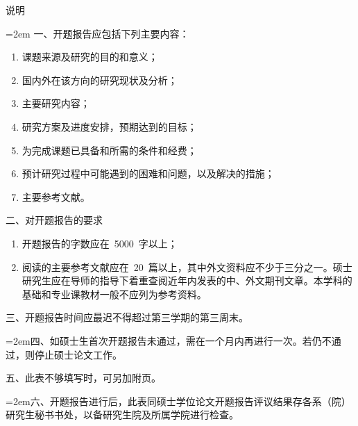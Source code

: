 {%
\newpage
\thispagestyle{empty}
\vspace*{2em}
\begin{center}
  \heiti{}说\hspace{3em}明
\end{center}
\vspace*{40pt}
	\renewcommand{\arraystretch}{1.25}
    {\songti{}
    \hangindent=2em
	\noindent 一、开题报告应包括下列主要内容：
    \begin{enumerate}[leftmargin=36pt]
	\item 课题来源及研究的目的和意义；
	\item 国内外在该方向的研究现状及分析；
	\item 主要研究内容；
	\item 研究方案及进度安排，预期达到的目标；
	\item 为完成课题已具备和所需的条件和经费；
	\item 预计研究过程中可能遇到的困难和问题，以及解决的措施；
	\item 主要参考文献。
    \end{enumerate}
    \noindent 二、对开题报告的要求
	\begin{enumerate}[leftmargin=36pt]
	\item 开题报告的字数应在~5000~字以上；
	\item 阅读的主要参考文献应在~20~篇以上，其中外文资料应不少于三分之一。硕士研究生应在导师的指导下着重查阅近年内发表的中、\hspace{-1pt}外文期刊文章。\hspace{-1pt}本学科的基础和专业课教材一般不应列为参考资料。
    \end{enumerate}
    \noindent 三、开题报告时间应最迟不得超过第三学期的第三周末。

    \hangindent=2em\noindent 四、如硕士生首次开题报告未通过，\hspace{-2pt}需在一个月内再进行一次。\hspace{-3pt}若仍不通过，\hspace{-2pt}则停止硕士论文工作。

    \noindent 五、此表不够填写时，可另加附页。

\hangindent=2em\noindent 六、开题报告进行后，此表同硕士学位论文开题报告评议结果存各系（院）研究生秘书书处，以备研究生院及所属学院进行检查。

    }
	\renewcommand{\arraystretch}{1}
    \clearpage
}
\fi
\makeatother
